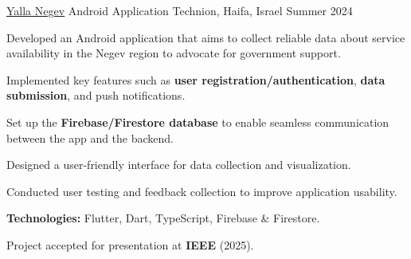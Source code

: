 
\begin{cventries}

  \cventry
    {\href{https://github.com/WizardCell/Yalla-Negev}{\underline{Yalla Negev}}} %
    {Android Application} %
    {Technion, Haifa, Israel} %
    {Summer 2024} %
    {
      \begin{cvitems} %
        \item {Developed an Android application that aims to collect reliable data about service availability in the Negev region to advocate for government support.}
        \item {Implemented key features such as \textbf{user registration/authentication}, \textbf{data submission}, and push notifications.}
        \item {Set up the \textbf{Firebase/Firestore database} to enable seamless communication between the app and the backend.}
        \item {Designed a user-friendly interface for data collection and visualization.}
        \item {Conducted user testing and feedback collection to improve application usability.}
        \item {\textbf{Technologies:} Flutter, Dart, TypeScript, Firebase \& Firestore.}
        \item {Project accepted for presentation at \textbf{IEEE} (2025).}
      \end{cvitems}
    }


\end{cventries}
